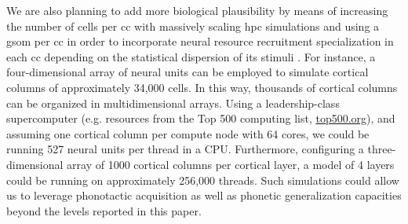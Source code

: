 \documentclass[10pt,letterpaper]{article}
\begin{document}
We are also planning to add more biological plausibility by means of increasing the number of cells per \gls{cc} with massively scaling \gls{hpc} simulations and using a \gls{gsom} per \gls{cc} in order to incorporate neural resource recruitment specialization in each \gls{cc} depending on the statistical dispersion of its stimuli \cite{Meyer19113}. For instance, a four-dimensional array of neural units can be employed to simulate cortical columns of approximately 34,000 cells. In this way, thousands of cortical columns can be organized in multidimensional arrays. Using a leadership-class supercomputer (e.g. resources from the Top 500 computing list, \url{top500.org}), and assuming one cortical column per compute node with 64 cores, we could be running 527 neural units per thread in a CPU. Furthermore, configuring a three-dimensional array of 1000 cortical columns per cortical layer, a model of 4 layers could be running on approximately 256,000 threads. Such simulations could allow us to leverage phonotactic acquisition as well as phonetic generalization capacities beyond the levels reported in this paper.









\end{document}
